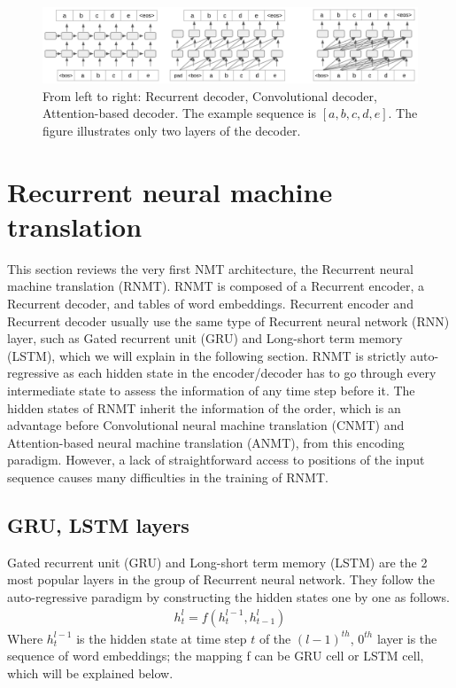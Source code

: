 \begin{figure}[htbp]
\includegraphics[width=\textwidth]{graphics/multi_layer_decoder.png}
\caption[Illustration of 3 most popular multi-layer auto-regressive decoding paradigms]{From left to right: Recurrent decoder, Convolutional decoder, Attention-based decoder. The example sequence is $[a,b,c,d,e]$. The figure illustrates only two layers of the decoder.}
\label{fig:multi-layer}
\end{figure}

\section{Recurrent neural machine translation} \label{sec:rrn}
This section reviews the very first NMT architecture, the Recurrent neural machine translation (RNMT). RNMT is composed of a Recurrent encoder, a Recurrent decoder, and tables of word embeddings. Recurrent encoder and Recurrent decoder usually use the same type of Recurrent neural network (RNN) layer, such as Gated recurrent unit (GRU) and Long-short term memory (LSTM), which we will explain in the following section. RNMT is strictly auto-regressive as each hidden state in the encoder/decoder has to go through every intermediate state to assess the information of any time step before it. The hidden states of RNMT inherit the information of the order, which is an advantage before Convolutional neural machine translation (CNMT) and Attention-based neural machine translation (ANMT), from this encoding paradigm. However, a lack of straightforward access to positions of the input sequence causes many difficulties in the training of RNMT.

\subsection{GRU, LSTM layers}
Gated recurrent unit (GRU) and Long-short term memory (LSTM) are the 2 most popular layers in the group of Recurrent neural network. They follow the auto-regressive paradigm by constructing the hidden states one by one as follows.
\begin{equation}
\begin{array}{rcl}
h^l_t = f(h^{l-1}_t, h^l_{t-1})
\end{array}
\end{equation}
Where $h^{l-1}_t$ is the hidden state at time step $t$ of the $(l-1)^{th}$, $0^{th}$ layer is the sequence of word embeddings; the mapping f can be GRU cell or LSTM cell, which will be explained below.

